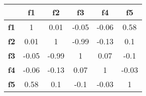 \begin{tabular}{|l|c|c|c|c|c|}
\hline
&\textbf{f1}&\textbf{f2}&\textbf{f3}&\textbf{f4}&\textbf{f5}\\\hline
\textbf{f1}&1&0.01&-0.05&-0.06&0.58\\\hline
\textbf{f2}&0.01&1&-0.99&-0.13&0.1\\\hline
\textbf{f3}&-0.05&-0.99&1&0.07&-0.1\\\hline
\textbf{f4}&-0.06&-0.13&0.07&1&-0.03\\\hline
\textbf{f5}&0.58&0.1&-0.1&-0.03&1\\\hline
\end{tabular}
